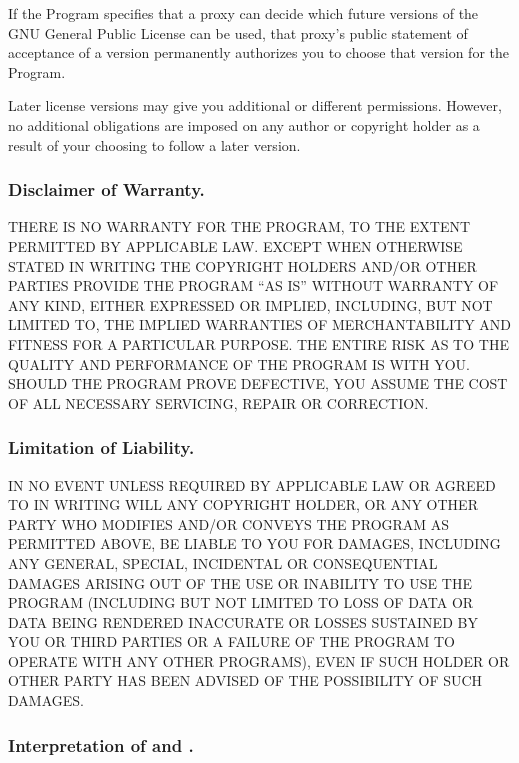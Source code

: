 \documentclass[10pt,english]{article}
\begin{document}
If the Program specifies that a proxy can decide which future versions
of the GNU General Public License can be used, that proxy's public
statement of acceptance of a version permanently authorizes you to
choose that version for the Program.

Later license versions may give you additional or different permissions.
However, no additional obligations are imposed on any author or copyright
holder as a result of your choosing to follow a later version.


\subsubsection{Disclaimer of Warranty.\label{sub:Disclaimer-of-Warranty.}}

THERE IS NO WARRANTY FOR THE PROGRAM, TO THE EXTENT PERMITTED BY APPLICABLE
LAW. EXCEPT WHEN OTHERWISE STATED IN WRITING THE COPYRIGHT HOLDERS
AND/OR OTHER PARTIES PROVIDE THE PROGRAM \textquotedblleft{}AS IS\textquotedblright{}
WITHOUT WARRANTY OF ANY KIND, EITHER EXPRESSED OR IMPLIED, INCLUDING,
BUT NOT LIMITED TO, THE IMPLIED WARRANTIES OF MERCHANTABILITY AND
FITNESS FOR A PARTICULAR PURPOSE. THE ENTIRE RISK AS TO THE QUALITY
AND PERFORMANCE OF THE PROGRAM IS WITH YOU. SHOULD THE PROGRAM PROVE
DEFECTIVE, YOU ASSUME THE COST OF ALL NECESSARY SERVICING, REPAIR
OR CORRECTION.


\subsubsection{Limitation of Liability.\label{sub:Limitation-of-Liability.}}

IN NO EVENT UNLESS REQUIRED BY APPLICABLE LAW OR AGREED TO IN WRITING
WILL ANY COPYRIGHT HOLDER, OR ANY OTHER PARTY WHO MODIFIES AND/OR
CONVEYS THE PROGRAM AS PERMITTED ABOVE, BE LIABLE TO YOU FOR DAMAGES,
INCLUDING ANY GENERAL, SPECIAL, INCIDENTAL OR CONSEQUENTIAL DAMAGES
ARISING OUT OF THE USE OR INABILITY TO USE THE PROGRAM (INCLUDING
BUT NOT LIMITED TO LOSS OF DATA OR DATA BEING RENDERED INACCURATE
OR LOSSES SUSTAINED BY YOU OR THIRD PARTIES OR A FAILURE OF THE PROGRAM
TO OPERATE WITH ANY OTHER PROGRAMS), EVEN IF SUCH HOLDER OR OTHER
PARTY HAS BEEN ADVISED OF THE POSSIBILITY OF SUCH DAMAGES.


\subsubsection{Interpretation of  and .}
\end{document}
